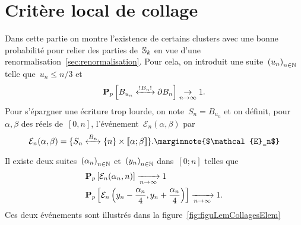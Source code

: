 \section{Critère local de collage}
Dans cette partie on montre l'existence de certains clusters avec une bonne probabilité pour relier des parties de~$\mathbb{S}_k$ en vue d'une renormalisation~\ref{sec:renormalisation}. Pour cela, on introduit une suite~$\suite{u}$ telle que~$u_n \leqslant n/3$ et %
	\begin{equation}\label{eq:toucherBordCarre}
		\Pp{\relie*[B_n]{B_{u_n}}{\partial B_n}} \underset{n \to \infty}{\to} 1. 
	\end{equation}
	Pour s'épargner une écriture trop lourde, on note~$S_n = B_{u_n}$  et on définit, pour~$\alpha, \beta$ des réels de~$[0, n]$, l'événement~$\mathcal{E}_n(\alpha, \beta)$ par
	\[
		\mathcal{E}_n( \alpha, \beta ) = \{\relie[B_n]{S_n}{\{n\} \times \llbracket \alpha ; \beta \rrbracket} \}. \marginnote{$\mathcal{E}_n$}
	\]
	
	\begin{lem}\label{lem:collagesElem} 
		Il existe deux suites~$\suite{\alpha}$ et~$\suite{y}$ dans~$[0; n]$ telles que
		\begin{align*}
			  &\bm{\mathrm{P}}_{p}\left[\mathcal{E}_n(\alpha_n, n)\right] \xrightarrow[n\to\infty]{} 1 \\ 
			  &\bm{\mathrm{P}}_{p}\left[\mathcal{E}_n\left(y_n - \frac{\alpha_n}{4}, y_n + \frac{\alpha_n}{4}\right)\right] \xrightarrow[n \to \infty]{} 1.
		\end{align*}
		Ces deux événements sont illustrés dans la figure~\ref{fig:figuLemCollagesElem}
	\end{lem}
	
